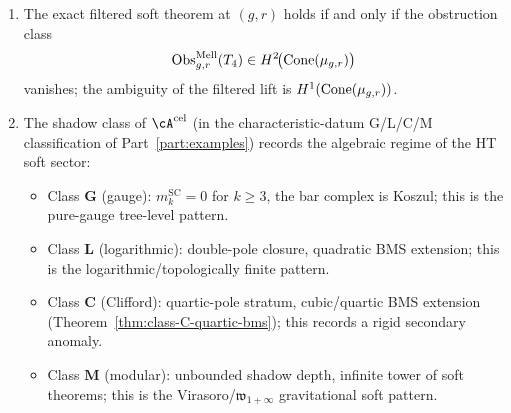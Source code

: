 \begin{theorem}
\begin{enumerate}[label=\textup{(\roman*)}]
\begin{itemize}
\item $r=2$: leading Weinberg soft theorem from $\Theta^{(0)}$ at
 shadow depth~$1$.
\item $r=3$: sub-leading Cachazo--Strominger soft theorem from
 $\Theta^{(0)}$ at shadow depth~$2$.
\item $r\geq 4$: higher soft-current comparison from
 $\Theta^{(0)}$ at shadow depth~$r-1$
 (Theorem~\ref{thm:higher-soft-shadow}).
\end{itemize}
\item The exact filtered soft theorem
at $(g,r)$ holds if and only if the obstruction class
\[
\operatorname{Obs}^{\mathrm{Mell}}_{g,r}(T_4)
\in
H^2\!\bigl(\operatorname{Cone}(\mu_{g,r})\bigr)
\]
vanishes; the ambiguity of the filtered lift is
$H^1(\operatorname{Cone}(\mu_{g,r}))$.
\item The shadow class of $\cA^{\mathrm{cel}}$ (in the characteristic-datum
G/L/C/M classification of Part~\ref{part:examples}) records the algebraic regime of the
HT soft sector:
\begin{itemize}
\item Class $\mathbf G$ (gauge): $m_k^{\mathrm{SC}}=0$ for $k\geq 3$, the
 bar complex is Koszul; this is the pure-gauge tree-level pattern.
\item Class $\mathbf L$ (logarithmic): double-pole closure, quadratic
 BMS extension; this is the logarithmic/topologically finite pattern.
\item Class $\mathbf C$ (Clifford): quartic-pole stratum, cubic/quartic
 BMS extension (Theorem~\ref{thm:class-C-quartic-bms}); this records
 a rigid secondary anomaly.
\item Class $\mathbf M$ (modular): unbounded shadow depth, infinite
 tower of soft theorems; this is the Virasoro/\(\mathfrak{w}_{1+\infty}\)
 gravitational soft pattern.
\end{itemize}
\end{enumerate}
\end{theorem}

